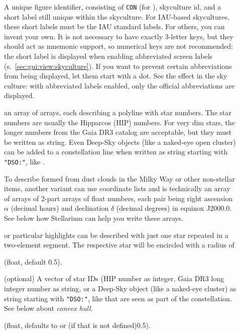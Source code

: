 \begin{description}
\item[] A unique figure identifier, consisting of \texttt{CON} (for ), skyculture id, and a short label still unique within the skyculture.
                 For IAU-based skycultures, these short labels must be the IAU standard labels. For others, you can invent your own. It is not necessary to have exactly
                 3-letter keys, but they should act as mnemonic support, so numerical keys are not recommended:  
                 the short label is displayed when enabling abbreviated screen labels (s.~\ref{sec:gui:view:skyculture}). If you want to prevent
                 certain abbreviations from being displayed, let them start with a dot. See the effect in the  sky culture: with abbreviated labels enabled,
                 only the official abbreviations are displayed.

\item[] an array of arrays, each describing a polyline with star numbers. The star numbers are usually the Hipparcos (HIP) numbers. 
                    For very dim stars, the longer numbers from the Gaia DR3 catalog are acceptable, but they must be written as string.
		    Even Deep-Sky objects (like a naked-eye open cluster) can be added to a constellation line when written as 
		    string starting with \texttt{"DSO:"}, like .

                    To describe  formed from dust clouds in the Milky Way or other non-stellar items, 
                    another variant can use coordinate lists and is technically an array of arrays of 2-part arrays of float numbers, 
                    each pair being right ascension $\alpha$ (decimal hours) and declination $\delta$ (decimal degrees) in equinox J2000.0. 
                    See below how Stellarium can help you write these arrays.

                      or particular highlights can be described with just one star repeated in a two-element segment.
                    The respective star will be encircled with a radius of 
\item[] (float, default 0.5).
\item[] (optional) A vector of star IDs (HIP number as integer, Gaia DR3 long integer number as string, 
                              or a Deep-Sky object (like a naked-eye cluster) as string starting with \texttt{"DSO:"}, like  that are seen as part of the constellation.
			      See below about \emph{convex hull}.
\item[] (float, defaults to  or (if that is not defined)0.5).


\end{description}
